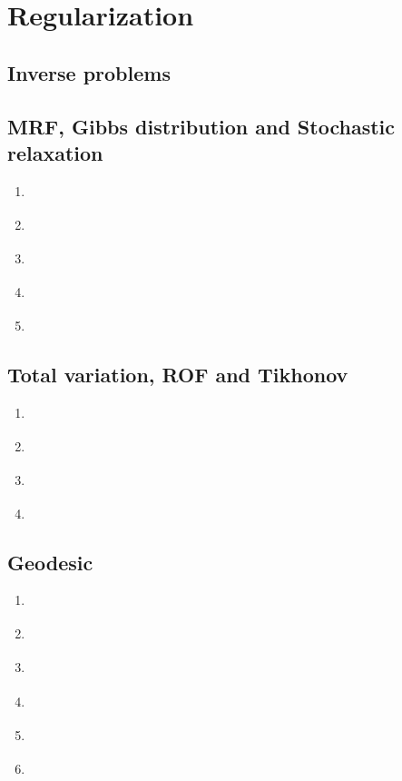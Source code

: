 \chapter{Regularization}

\section{Inverse problems}

\section{MRF, Gibbs distribution and Stochastic relaxation}
	\begin{enumerate}
		\item{ \cite{geman84} }
		\item{ \cite{jordan99} }				
		\item{ \cite{jaakkola00} }						
		\item{ \cite{yedidia03} }		
		\item{ \cite{bengal08} }		
	\end{enumerate}
	
\section{Total variation, ROF and Tikhonov}	
	\begin{enumerate}
		\item{ \cite{rudin92} }
		\item{ \cite{chambolle04} }
		\item{ \cite{duran13} }
		\item{ \cite{burger13} }
	\end{enumerate}

\section{Geodesic}
	\begin{enumerate}
		\item{ \cite{caselles93} }					
		\item{ \cite{caselles97} }
		\item{ \cite{cohen97} }		
		\item{ \cite{appleton05} }				
		\item{ \cite{peyre10} }
		\item{ \cite{li14} }
	\end{enumerate}